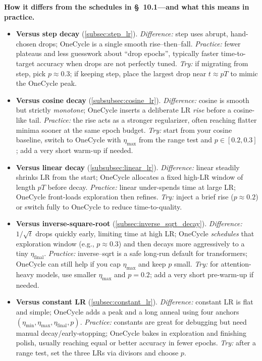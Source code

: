 \begin{enrichment}
	\medskip
	\noindent\textbf{How it differs from the schedules in \S~10.1—and what this means in practice.}
	\begin{itemize}
		\item \textbf{Versus step decay} (\autoref{subsec:step_lr}). \emph{Difference:} step uses abrupt, hand-chosen drops; OneCycle is a single smooth rise–then–fall. \emph{Practice:} fewer plateaus and less guesswork about ``drop epochs'', typically faster time-to-target accuracy when drops are not perfectly tuned. \emph{Try:} if migrating from step, pick $p\!\approx\!0.3$; if keeping step, place the largest drop near $t\!\approx\!pT$ to mimic the OneCycle peak.
		\item \textbf{Versus cosine decay} (\autoref{subsubsec:cosine_lr}). \emph{Difference:} cosine is smooth but strictly \emph{monotone}; OneCycle inserts a deliberate LR \emph{rise} before a cosine-like tail. \emph{Practice:} the rise acts as a stronger regularizer, often reaching flatter minima sooner at the same epoch budget. \emph{Try:} start from your cosine baseline, switch to OneCycle with $\eta_{\max}$ from the range test and $p\!\in[0.2,0.3]$; add a very short warm-up if needed.
		\item \textbf{Versus linear decay} (\autoref{subsubsec:linear_lr}). \emph{Difference:} linear steadily shrinks LR from the start; OneCycle allocates a fixed high-LR window of length $pT$ before decay. \emph{Practice:} linear under-spends time at large LR; OneCycle front-loads exploration then refines. \emph{Try:} inject a brief rise ($p\!\approx\!0.2$) or switch fully to OneCycle to reduce time-to-quality.
		\item \textbf{Versus inverse-square-root} (\autoref{subsec:inverse_sqrt_decay}). \emph{Difference:} $1/\sqrt{t}$ drops quickly early, limiting time at high LR; OneCycle \emph{schedules} that exploration window (e.g., $p\!\approx\!0.3$) and then decays more aggressively to a tiny $\eta_{\text{final}}$. \emph{Practice:} inverse–sqrt is a safe long-run default for transformers; OneCycle can still help if you cap $\eta_{\max}$ and keep $p$ small. \emph{Try:} for attention-heavy models, use smaller $\eta_{\max}$ and $p{=}0.2$; add a very short pre-warm-up if needed.
		\item \textbf{Versus constant LR} (\autoref{subsec:constant_lr}). \emph{Difference:} constant LR is flat and simple; OneCycle adds a peak and a long anneal using four anchors $(\eta_{\min},\eta_{\max},\eta_{\text{final}},p)$. \emph{Practice:} constants are great for debugging but need manual decay/early-stopping; OneCycle bakes in exploration and finishing polish, usually reaching equal or better accuracy in fewer epochs. \emph{Try:} after a range test, set the three LRs via divisors and choose $p$.

\end{itemize}
\end{enrichment}
